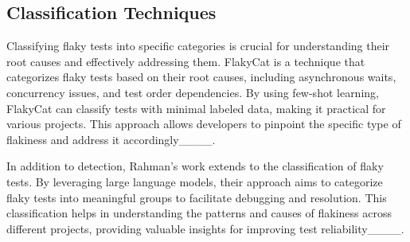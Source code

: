 \subsection{Classification Techniques}

Classifying flaky tests into specific categories is crucial for understanding their root causes and effectively addressing them. FlakyCat is a technique that categorizes flaky tests based on their root causes, including asynchronous waits, concurrency issues, and test order dependencies. By using few-shot learning, FlakyCat can classify tests with minimal labeled data, making it practical for various projects. This approach allows developers to pinpoint the specific type of flakiness and address it accordingly____.

In addition to detection, Rahman’s work extends to the classification of flaky tests. By leveraging large language models, their approach aims to categorize flaky tests into meaningful groups to facilitate debugging and resolution. This classification helps in understanding the patterns and causes of flakiness across different projects, providing valuable insights for improving test reliability____.